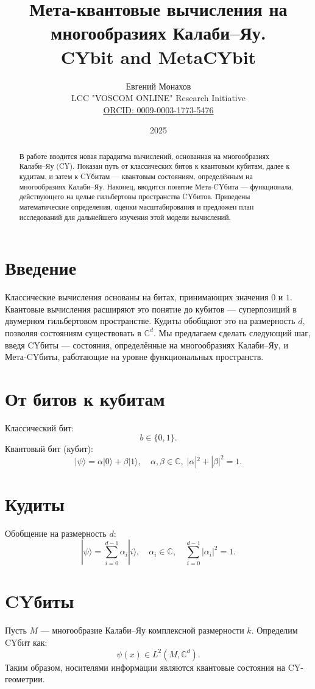 \documentclass[12pt,a4paper]{article}
\title{Мета-квантовые вычисления на многообразиях Калаби--Яу.\\ CYbit and MetaCYbit}
\author{Евгений Монахов \\ LCC "VOSCOM ONLINE" Research Initiative \\ 
\href{https://orcid.org/0009-0003-1773-5476}{ORCID: 0009-0003-1773-5476}}
\date{2025}
\begin{document}
\maketitle

\begin{abstract}
В работе вводится новая парадигма вычислений, основанная на многообразиях Калаби--Яу (CY).
Показан путь от классических битов к квантовым кубитам, далее к кудитам,
и затем к CYбитам — квантовым состояниям, определённым на многообразиях Калаби--Яу.
Наконец, вводится понятие Мета-CYбита — функционала, действующего на целые гильбертовы пространства CYбитов.
Приведены математические определения, оценки масштабирования и предложен план исследований
для дальнейшего изучения этой модели вычислений.
\end{abstract}

\section{Введение}
Классические вычисления основаны на битах, принимающих значения $0$ и $1$.  
Квантовые вычисления расширяют это понятие до кубитов — суперпозиций в двумерном гильбертовом пространстве.  
Кудиты обобщают это на размерность $d$, позволяя состояниям существовать в $\mathbb{C}^d$.  
Мы предлагаем сделать следующий шаг, введя CYбиты — состояния, определённые на многообразиях Калаби--Яу, 
и Мета-CYбиты, работающие на уровне функциональных пространств.  

\section{От битов к кубитам}
Классический бит:
\[
b \in \{0,1\}.
\]
Квантовый бит (кубит):
\[
|\psi\rangle = \alpha |0\rangle + \beta |1\rangle, \quad \alpha,\beta \in \mathbb{C}, \; |\alpha|^2+|\beta|^2=1.
\]

\section{Кудиты}
Обобщение на размерность $d$:
\[
|\psi\rangle = \sum_{i=0}^{d-1} \alpha_i |i\rangle, \quad \alpha_i \in \mathbb{C}, \quad \sum_{i=0}^{d-1}|\alpha_i|^2=1.
\]

\section{CYбиты}
Пусть $M$ — многообразие Калаби--Яу комплексной размерности $k$.  
Определим CYбит как:
\[
\psi(x) \in L^2(M,\mathbb{C}^d).
\]
Таким образом, носителями информации являются квантовые состояния на CY-геометрии.  
\end{document}
